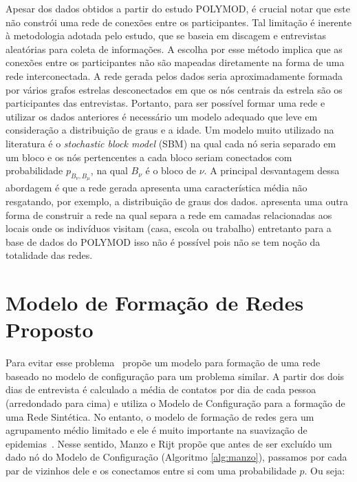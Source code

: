 Apesar dos dados obtidos a partir do estudo POLYMOD, é crucial notar que este não constrói uma rede de conexões entre os participantes. Tal limitação é inerente à metodologia adotada pelo estudo, que se baseia em discagem e entrevistas
aleatórias para coleta de informações. A escolha por esse método implica que as conexões entre os participantes não são mapeadas diretamente na forma de uma rede interconectada. A rede gerada pelos dados seria aproximadamente formada por vários grafos estrelas desconectados em que os nós centrais da estrela são os participantes das entrevistas. Portanto, para ser possível formar uma rede e utilizar os dados anteriores é necessário um modelo adequado que leve em consideração a distribuição de graus e a idade. Um modelo muito utilizado na literatura é o \textit{stochastic block model} (SBM) \cite{SBM} na qual cada nó seria separado em um bloco e os nós pertencentes a cada bloco seriam conectados com probabilidade $p_{B_\nu,B_\mu}$, na qual $B_\nu$ é o bloco de $\nu$. A principal desvantagem dessa abordagem é que a rede gerada apresenta uma característica média não resgatando, por exemplo, a distribuição de graus dos dados.  apresenta uma outra forma de construir a rede na qual separa a rede em camadas relacionadas aos locais onde os indivíduos visitam (casa, escola ou trabalho) entretanto para a base de dados do POLYMOD isso não é possível pois não se tem noção da totalidade das redes.

\section{Modelo de Formação de Redes Proposto}

Para evitar esse problema~\cite{Manzo2020} propõe um modelo para formação de uma rede baseado 
no modelo de configuração para um problema similar. A partir dos dois dias de entrevista é calculado a média de contatos por dia de cada pessoa (arredondado para cima) e utiliza o Modelo de Configuração para a formação de uma Rede Sintética. No entanto, o modelo de formação de redes gera um agrupamento médio limitado e ele é muito importante na suavização de epidemias~\cite{Block2020}. Nesse sentido, 
Manzo e Rijt propõe que antes de ser excluído um dado nó do Modelo de Configuração (Algoritmo \ref{alg:manzo}), passamos por cada
par de vizinhos dele e os conectamos entre si com uma probabilidade $p$. Ou seja:

